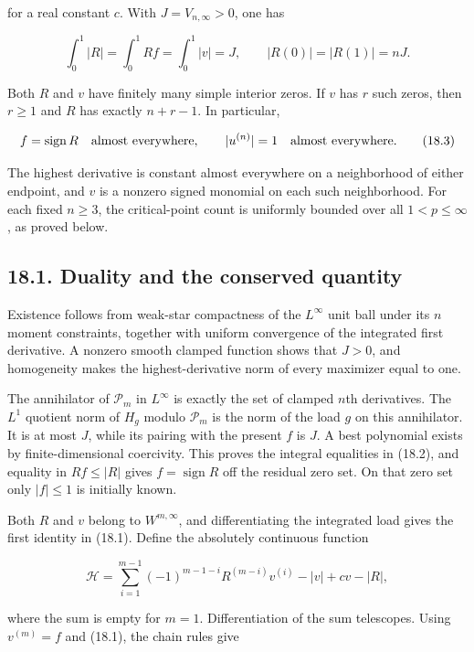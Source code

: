 \documentclass[11pt]{article}
\begin{document}
for a real constant \(c\). With \(J=V_{n,\infty}>0\), one has

\[
\int_0^1|R|=\int_0^1Rf=\int_0^1|v|=J,
\qquad |R(0)|=|R(1)|=nJ.
\tag{18.2}
\]

Both \(R\) and \(v\) have finitely many simple interior zeros. If \(v\)
has \(r\) such zeros, then \(r\ge1\) and \(R\) has exactly \(n+r-1\). In
particular,

\[
f=\operatorname{sign}R\quad\hbox{almost everywhere},
\qquad |u^{(n)}|=1\quad\hbox{almost everywhere}.
\tag{18.3}
\]

The highest derivative is constant almost everywhere on a neighborhood
of either endpoint, and \(v\) is a nonzero signed monomial on each such
neighborhood. For each fixed \(n\ge3\), the critical-point count is
uniformly bounded over all \(1<p\le\infty\), as proved below.

\subsection{18.1. Duality and the conserved
quantity}\label{duality-and-the-conserved-quantity}

Existence follows from weak-star compactness of the \(L^\infty\) unit
ball under its \(n\) moment constraints, together with uniform
convergence of the integrated first derivative. A nonzero smooth clamped
function shows that \(J>0\), and homogeneity makes the
highest-derivative norm of every maximizer equal to one.

The annihilator of \(\mathcal P_m\) in \(L^\infty\) is exactly the set
of clamped \(n\)th derivatives. The \(L^1\) quotient norm of \(H_g\)
modulo \(\mathcal P_m\) is the norm of the load \(g\) on this
annihilator. It is at most \(J\), while its pairing with the present
\(f\) is \(J\). A best polynomial exists by finite-dimensional
coercivity. This proves the integral equalities in (18.2), and equality
in \(Rf\le|R|\) gives \(f=\operatorname{sign}R\) off the residual zero
set. On that zero set only \(|f|\le1\) is initially known.

Both \(R\) and \(v\) belong to \(W^{m,\infty}\), and differentiating the
integrated load gives the first identity in (18.1). Define the
absolutely continuous function

\[
\mathcal H=
\sum_{i=1}^{m-1}(-1)^{m-1-i}R^{(m-i)}v^{(i)}
-|v|+cv-|R|,
\tag{18.4}
\]

where the sum is empty for \(m=1\). Differentiation of the sum
telescopes. Using \(v^{(m)}=f\) and (18.1), the chain rules give
\end{document}
